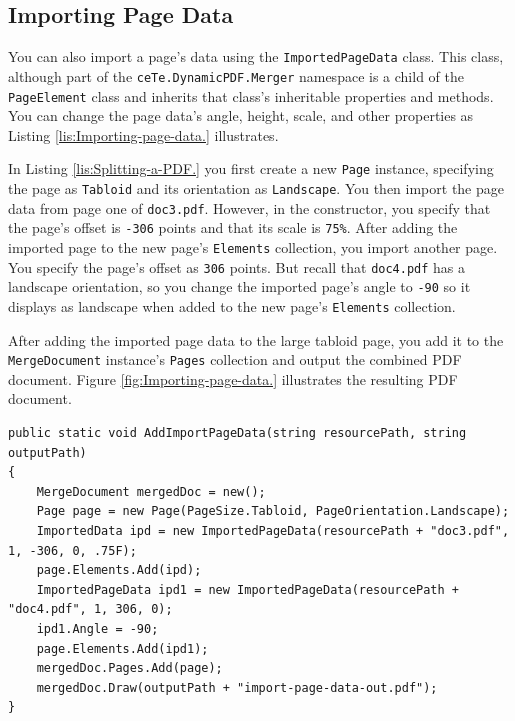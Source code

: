 \documentclass[american]{tufte-book}
\numberwithin{equation}{section}
\numberwithin{figure}{section}
\begin{document}
{{\subsection{Importing Page Data}

You can also import a page's data using the \texttt{ImportedPageData}
class. This class, although part of the \texttt{ceTe.DynamicPDF.Merger}
namespace is a child of the \texttt{PageElement} class and inherits
that class's inheritable properties and methods. You can change the
page data's angle, height, scale, and other properties as Listing
\ref{lis:Importing-page-data.} illustrates.

In Listing \ref{lis:Splitting-a-PDF.} you first create a new \texttt{Page}
instance, specifying the page as \texttt{Tabloid} and its orientation
as \texttt{Landscape}. You then import the page data from page one
of \texttt{doc3.pdf}. However, in the constructor, you specify that
the page's offset is \texttt{-306} points and that its scale is \texttt{75\%}.
After adding the imported page to the new page's \texttt{Elements}
collection, you import another page. You specify the page's offset
as \texttt{306} points. But recall that \texttt{doc4.pdf} has a landscape
orientation, so you change the imported page's angle to \texttt{-90}
so it displays as landscape when added to the new page's \texttt{Elements}
collection.

After adding the imported page data to the large tabloid page, you
add it to the \texttt{MergeDocument} instance's \texttt{Pages} collection
and output the combined PDF document. Figure \ref{fig:Importing-page-data.}
illustrates the resulting PDF document.

\bgroup{}
\begin{lstlisting}[caption={Importing page data.},label={lis:Importing-page-data.},basicstyle={\footnotesize\ttfamily},breaklines=true]
public static void AddImportPageData(string resourcePath, string outputPath)
{
    MergeDocument mergedDoc = new();
    Page page = new Page(PageSize.Tabloid, PageOrientation.Landscape);
    ImportedData ipd = new ImportedPageData(resourcePath + "doc3.pdf", 1, -306, 0, .75F);
    page.Elements.Add(ipd);
    ImportedPageData ipd1 = new ImportedPageData(resourcePath + "doc4.pdf", 1, 306, 0);
    ipd1.Angle = -90;
    page.Elements.Add(ipd1);
    mergedDoc.Pages.Add(page);
    mergedDoc.Draw(outputPath + "import-page-data-out.pdf");
}
\end{lstlisting}
\leavevmode\egroup

}}
\end{document}
